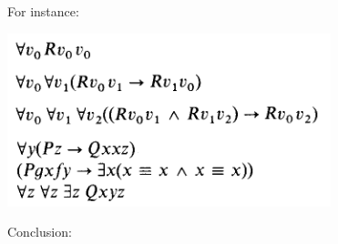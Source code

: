 \documentclass[10pt,a4paper]{article}
\begin{document}
		For instance:

		\begin{center}
		\includegraphics[scale=1]{exemplos}
		\end{center}

		\vspace{120mm}

		Conclusion:

		\vspace{3mm}
\end{document}
